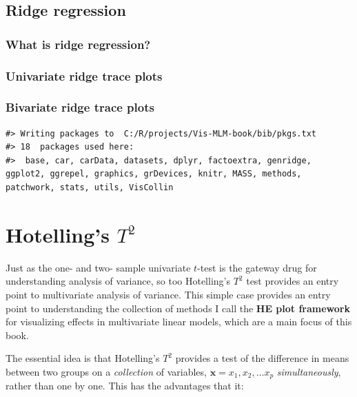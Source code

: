 \documentclass[
  letterpaper,
  10pt,
  krantz2]{krantz}
\begin{document}
\hypertarget{sec:ridge}{%
\section{Ridge regression}\label{sec:ridge}}

\hypertarget{what-is-ridge-regression}{%
\subsection{What is ridge regression?}\label{what-is-ridge-regression}}

\hypertarget{univariate-ridge-trace-plots}{%
\subsection{Univariate ridge trace
plots}\label{univariate-ridge-trace-plots}}

\hypertarget{bivariate-ridge-trace-plots}{%
\subsection{Bivariate ridge trace
plots}\label{bivariate-ridge-trace-plots}}

\begin{verbatim}
#> Writing packages to  C:/R/projects/Vis-MLM-book/bib/pkgs.txt
#> 18  packages used here:
#>  base, car, carData, datasets, dplyr, factoextra, genridge, ggplot2, ggrepel, graphics, grDevices, knitr, MASS, methods, patchwork, stats, utils, VisCollin
\end{verbatim}


\hypertarget{sec-Hotelling}{%
\chapter{\texorpdfstring{Hotelling's
\(T^2\)}{Hotelling's T\^{}2}}\label{sec-Hotelling}}

Just as the one- and two- sample univariate \(t\)-test is the gateway
drug for understanding analysis of variance, so too Hotelling's \(T^2\)
test provides an entry point to multivariate analysis of variance. This
simple case provides an entry point to understanding the collection of
methods I call the \textbf{HE plot framework} for visualizing effects in
multivariate linear models, which are a main focus of this book.

The essential idea is that Hotelling's \(T^2\) provides a test of the
difference in means between two groups on a \emph{collection} of
variables, \(\mathbf{x} = x_1, x_2, \dots x_p\) \emph{simultaneously},
rather than one by one. This has the advantages that it:
\end{document}
